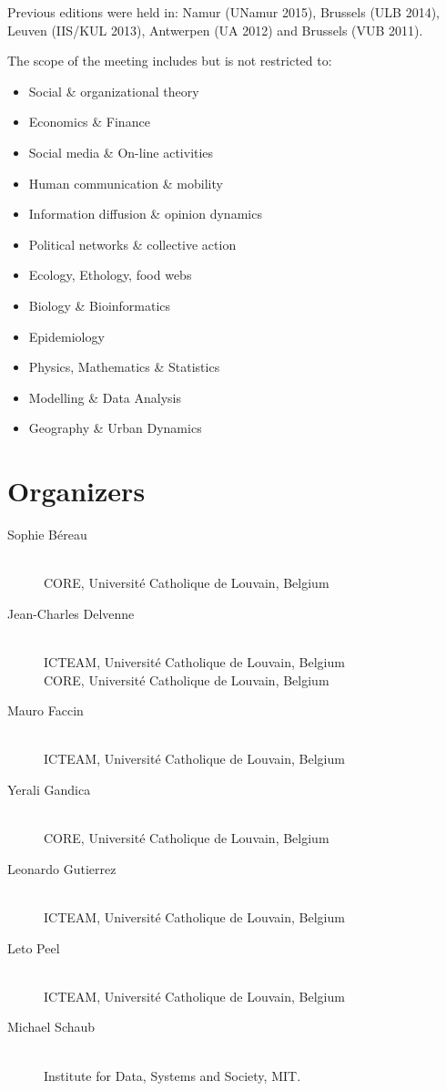 \documentclass[11pt, a4paper, openany]{scrbook}
\begin{document}
Previous editions were held in:
Namur (UNamur 2015),
Brussels (ULB 2014),
Leuven (IIS/KUL 2013),
Antwerpen (UA 2012) and
Brussels (VUB 2011).

The scope of the meeting includes but is not restricted to:

\begin{itemize}
  \item  Social \& organizational theory
  \item  Economics \& Finance
  \item  Social media \& On-line activities
  \item  Human communication \& mobility
  \item  Information diffusion \& opinion dynamics
  \item  Political networks \& collective action
  \item  Ecology, Ethology, food webs
  \item  Biology \& Bioinformatics
  \item  Epidemiology
  \item  Physics, Mathematics \& Statistics
  \item  Modelling \& Data Analysis
  \item  Geography \& Urban Dynamics
\end{itemize}

\begin{center}
  
\end{center}

\section*{Organizers}

\newcommand{\icteam}{ICTEAM, Université Catholique de Louvain, Belgium}
\newcommand{\core}{CORE, Université Catholique de Louvain, Belgium}
\begin{description}
  \item[Sophie Béreau]\ \\
    \core%
  \item[Jean-Charles Delvenne]\ \\
    \icteam\\
    \core%
  \item[Mauro Faccin]\ \\
    \icteam%
  \item[Yerali Gandica]\ \\
    \core%
  \item[Leonardo Gutierrez]\ \\
    \icteam%
  \item[Leto Peel]\ \\
    \icteam%
  \item[Michael Schaub]\ \\
    Institute for Data, Systems and Society, MIT.
\end{description}
\end{document}
